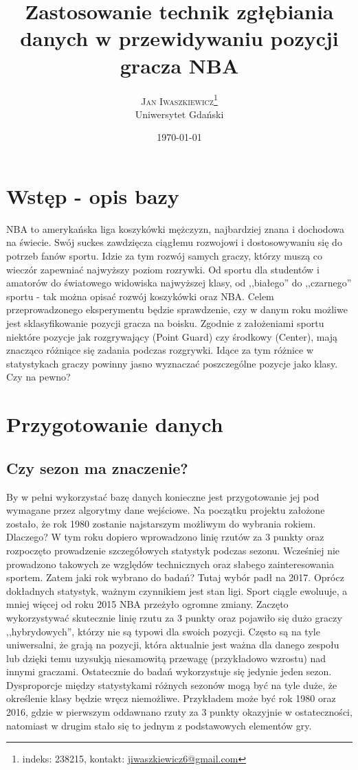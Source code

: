 \documentclass[twoside,twocolumn]{article}
\title{Zastosowanie technik zgłębiania danych w przewidywaniu pozycji gracza NBA} %
\author{%
\textsc{Jan Iwaszkiewicz}\thanks{indeks: 238215, kontakt: \href{mailto:jiwaszkiewicz6@gmail.com}{jiwaszkiewicz6@gmail.com}} \\[1ex] %
\normalsize Uniwersytet Gdański \\ %
}
\date{\today} %
\begin{document}
\maketitle


\section{Wstęp - opis bazy}

\lettrine[nindent=0em,lines=3]NBA to amerykańska liga koszykówki mężczyzn, najbardziej znana i dochodowa na świecie. Swój suckes zawdzięcza ciągłemu rozwojowi i dostosowywaniu się do potrzeb fanów sportu. Idzie za tym rozwój samych graczy, którzy muszą co wieczór zapewniać najwyższy poziom rozrywki. Od sportu dla studentów i amatorów do światowego widowiska najwyższej klasy, od ,,białego'' do ,,czarnego'' sportu - tak można opisać rozwój koszykówki oraz NBA. Celem przeprowadzonego eksperymentu będzie sprawdzenie, czy w danym roku możliwe jest sklasyfikowanie pozycji gracza na boisku. Zgodnie z założeniami sportu niektóre pozycje jak rozgrywający (Point Guard) czy środkowy (Center), mają znacząco różniące się zadania podczas rozgrywki. Idące za tym różnice w statystykach graczy powinny jasno wyznaczać poszczególne pozycje jako klasy. Czy na pewno?

\section{Przygotowanie danych}
\subsection{Czy sezon ma znaczenie?}
By w pełni wykorzystać bazę danych konieczne jest przygotowanie jej pod wymagane przez algorytmy dane wejściowe. Na początku projektu założone zostało, że rok 1980 zostanie najstarszym możliwym do wybrania rokiem. Dlaczego? W tym roku dopiero wprowadzono linię rzutów za 3 punkty oraz rozpoczęto prowadzenie szczegółowych statystyk podczas sezonu. Wcześniej nie prowadzono takowych ze względów technicznych oraz słabego zainteresowania sportem. Zatem jaki rok wybrano do badań? Tutaj wybór padł na 2017. Oprócz dokładnych statystyk, ważnym czynnikiem jest stan ligi. Sport ciągle ewoluuje, a mniej więcej od roku 2015 NBA przeżyło ogromne zmiany. Zaczęto wykorzystywać skutecznie linię rzutu za 3 punkty oraz pojawiło się dużo graczy ,,hybrydowych'', którzy nie są typowi dla swoich pozycji. Często są na tyle uniwersalni, że grają na pozycji, która aktualnie jest ważna dla danego zespołu lub dzięki temu uzysukją niesamowitą przewagę (przykładowo wzrostu) nad innymi graczami. Ostatecznie do badań wykorzystuje się jedynie jeden sezon. Dysproporcje między statystykami różnych sezonów mogą być na tyle duże, że określenie klasy będzie wręcz niemożliwe. Przykładem może być rok 1980 oraz 2016, gdzie w pierwszym oddawnano rzuty za 3 punkty okazyjnie w ostateczności, natomiast w drugim stało się to jednym z podstawowych elementów gry. 
\end{document}
